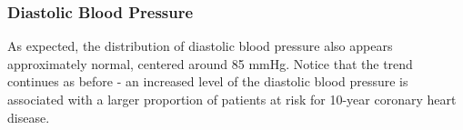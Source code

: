 \documentclass[10pt]{article}
\begin{document}
\begin{figure}[hbt!]
\hspace*{\fill}
\centering
{}\hspace{2em}%
%
\hspace*{\fill}
\end{figure}


\subsubsection*{Diastolic Blood Pressure}

As expected, the distribution of diastolic blood pressure also appears approximately normal, centered around 85 mmHg. Notice that the trend continues as before - an increased level of the diastolic blood pressure is associated with a larger proportion of patients at risk for 10-year coronary heart disease.
\end{document}
